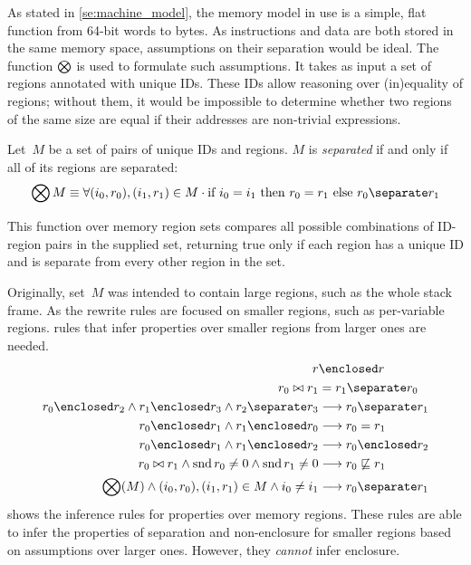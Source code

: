 As stated in \cref{se:machine_model}, the memory model in use is a simple,
flat function from 64-bit words to bytes.
As instructions and data are both stored in the same memory space,
assumptions on their separation would be ideal.
The function $\operatorname{\bigotimes}$ is used to formulate such assumptions.
It takes as input a set of regions annotated with unique IDs.
These IDs allow reasoning over (in)equality of regions; without them,
it would be impossible to determine whether two regions of the same size are equal
if their addresses are non-trivial expressions.
\begin{definition}
  Let~$M$ be a set of pairs of unique IDs and regions.
  $M$ is \emph{separated} if and only if all of its regions are separated:
  \begin{equation}
    \seps M\equiv\forall(i_0,r_0),(i_1,r_1)\in M\cdot
    \text{if }i_0=i_1\text{ then }r_0=r_1\text{ else }r_0\separate r_1
  \end{equation}
\end{definition}
This function over memory region sets compares all possible combinations of
ID-region pairs in the supplied set, returning true only if each region
has a unique ID and is separate from every other region in the set.

Originally, set~$M$ was intended to contain large regions,
such as the whole stack frame.
As the rewrite rules are focused on smaller regions, such as per-variable regions.
rules that infer properties over smaller regions from larger ones are needed.
\begin{subequations}\label{rules_sep_enc}
  \begin{align}
    r &\enclosed r \\
    r_0\bowtie r_1 &= r_1\separate r_0 \\
    r_0\enclosed r_2\wedge r_1\enclosed r_3\wedge r_2\separate r_3 &\longrightarrow r_0\separate r_1 \\
    r_0\enclosed r_1\wedge r_1\enclosed r_0 &\longrightarrow r_0=r_1 \\
    r_0\enclosed r_1\wedge r_1\enclosed r_2 &\longrightarrow r_0\enclosed r_2 \\
    r_0\bowtie r_1\wedge\snd{r_0}\neq 0\wedge\snd{r_1}\neq 0 &\longrightarrow r_0 \not\sqsubseteq r_1 \\
    \seps(M)\wedge(i_0,r_0),(i_1,r_1)\in M\wedge i_0\neq i_1 &\longrightarrow r_0\separate r_1
  \end{align}
\end{subequations}
 shows the inference rules for properties over memory regions.
These rules are able to infer the properties of separation and non-enclosure
for smaller regions based on assumptions over larger ones.
However, they \emph{cannot} infer enclosure.

